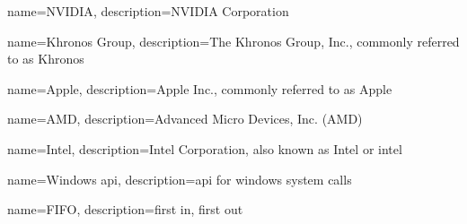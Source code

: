 {
  name={NVIDIA},
  description={NVIDIA Corporation}
}

{
  name={Khronos Group},
  description={The Khronos Group, Inc., commonly referred to as Khronos}
}

{
  name={Apple},
  description={Apple Inc., commonly referred to as Apple}
}

{
  name={AMD},
  description={Advanced Micro Devices, Inc. (AMD)}
}

{
  name={Intel},
  description={Intel Corporation, also known as Intel or intel}
}

{
  name={Windows \gls{api}},
  description={\gls{api} for \gls{windows} system calls}
}

{
  name={FIFO},
  description={first in, first out}
}
